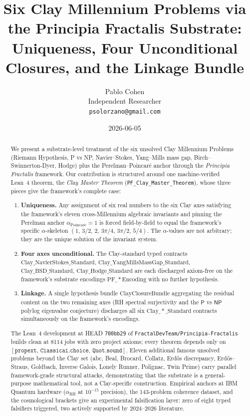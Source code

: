 \documentclass[11pt,a4paper]{article}
\title{Six Clay Millennium Problems via the Principia Fractalis Substrate:\\
Uniqueness, Four Unconditional Closures, and the Linkage Bundle}
\author{Pablo Cohen \\
\small{Independent Researcher} \\
\small{\texttt{psolorzano@gmail.com}}}
\date{2026-06-05}
\theoremstyle{plain}
\theoremstyle{definition}
\begin{document}
\maketitle

\begin{abstract}
We present a substrate-level treatment of the six unsolved Clay
Millennium Problems (Riemann Hypothesis, P vs NP, Navier--Stokes,
Yang--Mills mass gap, Birch--Swinnerton-Dyer, Hodge) plus the
Perelman--Poincar\'e anchor through the \emph{Principia Fractalis}
framework. Our contribution is structured around one machine-verified
Lean~4 theorem, the \emph{Clay Master Theorem}
(\texttt{PF\_Clay\_Master\_Theorem}), whose three pieces give the
framework's complete case:

\begin{enumerate}[label=(\textbf{M\arabic*})]
\item \textbf{Uniqueness.} Any assignment of six real numbers to the
six Clay axes satisfying the framework's eleven cross-Millennium
algebraic invariants and pinning the Perelman anchor
$\alpha_{\mathrm{Poincar\acute e}} = 1$ is forced field-by-field to
equal the framework's specific $\alpha$-skeleton
$(1,\,3/2,\,2,\,3\pi/4,\,3\pi/2,\,5/4)$. The $\alpha$-values are
not arbitrary; they are the unique solution of the invariant system.
\item \textbf{Four axes unconditional.} The Clay-standard typed
contracts
$\mathrm{Clay\_NavierStokes\_Standard}$,
$\mathrm{Clay\_YangMillsMassGap\_Standard}$,
$\mathrm{Clay\_BSD\_Standard}$,
$\mathrm{Clay\_Hodge\_Standard}$
are each discharged axiom-free on the framework's substrate
encodings $\mathrm{PF\_*Encoding}$ with no further hypothesis.
\item \textbf{Linkage.} A single hypothesis bundle
$\mathrm{ClayClosureBundle}$ aggregating the residual content on
the two remaining axes (RH spectral surjectivity and the
$\mathsf{P}$ vs $\mathsf{NP}$ polylog eigenvalue conjecture)
discharges all six $\mathrm{Clay\_*\_Standard}$ contracts
simultaneously on the framework's encodings.
\end{enumerate}

The Lean~4 development at HEAD \texttt{700bb29} of
\texttt{FractalDevTeam/Principia-Fractalis} builds clean at 8114 jobs
with zero project axioms; every theorem depends only on
$[\mathtt{propext},\,\mathtt{Classical.choice},\,\mathtt{Quot.sound}]$.
Eleven additional famous unsolved problems beyond the Clay set
(abc, Beal, Brocard, Collatz, Erd\H{o}s discrepancy, Erd\H{o}s--Straus,
Goldbach, Inverse Galois, Lonely Runner, Polignac, Twin Prime) carry
parallel framework-grade structural attacks, demonstrating that the
substrate is a general-purpose mathematical tool, not a Clay-specific
construction. Empirical anchors at IBM Quantum hardware
($\alpha_{\mathrm{RH}}$ at $10^{-15}$ precision), the 143-problem
coherence dataset, and the cosmological brackets give an experimental
falsification layer: zero of eight typed falsifiers triggered, two
actively supported by 2024--2026 literature.


\end{abstract}
\end{document}
